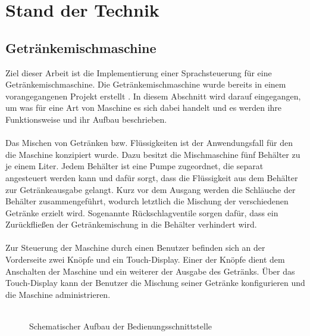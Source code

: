 \chapter{Stand der Technik}
\section{Getränkemischmaschine}
Ziel dieser Arbeit ist die Implementierung einer Sprachsteuerung für eine Getränkemischmaschine. Die Getränkemischmaschine wurde bereits in einem vorangegangenen Projekt erstellt \cite{mischmaschine}. In diesem Abschnitt wird darauf eingegangen, um was für eine Art von Maschine es sich dabei handelt und es werden ihre Funktionsweise und ihr Aufbau beschrieben.\\\\
Das Mischen von Getränken bzw. Flüssigkeiten ist der Anwendungsfall für den die Maschine konzipiert wurde. Dazu besitzt die Mischmaschine fünf Behälter zu je einem Liter. Jedem Behälter ist eine Pumpe zugeordnet, die separat angesteuert werden kann und dafür sorgt, dass die Flüssigkeit aus dem Behälter zur Getränkeausgabe gelangt. Kurz vor dem Ausgang werden die Schläuche der Behälter zusammengeführt, wodurch letztlich die Mischung der verschiedenen Getränke erzielt wird. Sogenannte \glqq{}Rückschlagventile\grqq{} sorgen dafür, dass ein Zurückfließen der Getränkemischung in die Behälter verhindert wird.\\\\
Zur Steuerung der Maschine durch einen Benutzer befinden sich an der Vorderseite zwei Knöpfe und ein Touch-Display. Einer der Knöpfe dient dem Anschalten der Maschine und ein weiterer der Ausgabe des Getränks. Über das Touch-Display kann der Benutzer die Mischung seiner Getränke konfigurieren und die Maschine administrieren.\\\\
\begin{figure}[H]
    \centering
    \caption{Schematischer Aufbau der Bedienungsschnittstelle}
    \label{fig:bedienungsschnittstelle_mischmaschine}
\end{figure}
